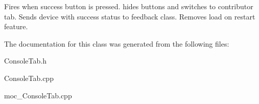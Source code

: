 Fires when success button is pressed. hides buttons and switches to contributor tab. Sends device with success status to feedback class. Removes load on restart feature. 

The documentation for this class was generated from the following files\+:\begin{DoxyCompactItemize}
\item 
Console\+Tab.\+h\item 
Console\+Tab.\+cpp\item 
moc\+\_\+\+Console\+Tab.\+cpp\end{DoxyCompactItemize}
